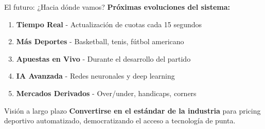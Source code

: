 \documentclass[aspectratio=169]{beamer}
\begin{document}
\begin{frame}{El futuro: ¿Hacia dónde vamos?}
\textbf{Próximas evoluciones del sistema:}

\vspace{0.5cm}
\begin{enumerate}
\item \textcolor{azulprincipai}{\textbf{Tiempo Real}} - Actualización de cuotas cada 15 segundos
\item \textcolor{verdepositivo}{\textbf{Más Deportes}} - Basketball, tenis, fútbol americano
\item \textcolor{rojocomplementario}{\textbf{Apuestas en Vivo}} - Durante el desarrollo del partido
\item \textcolor{azulprincipai}{\textbf{IA Avanzada}} - Redes neuronales y deep learning
\item \textcolor{verdepositivo}{\textbf{Mercados Derivados}} - Over/under, handicaps, corners
\end{enumerate}

\vspace{0.5cm}
\begin{block}{Visión a largo plazo}
\textbf{Convertirse en el estándar de la industria} para pricing deportivo automatizado, democratizando el acceso a tecnología de punta.
\end{block}
\end{frame}
\end{document}

